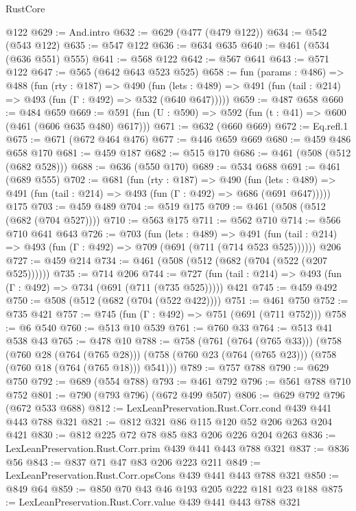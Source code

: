 \begin{lexlean}{RustCore}
\begin{coremodule}
    @122
@629 := And.intro
@632 := @629 (@477 (@479 @122))
@634 := @542 (@543 @122)
@635 := @547 @122
@636 := @634 @635
@640 := @461 (@534 (@636 @551) @555)
@641 := @568 @122
@642 := @567 @641
@643 := @571 @122
@647 := @565 (@642 @643 @523 @525)
@658 := fun (params : @486) =>
  @488
    (fun (rty : @187) =>
    @490
      (fun (lets : @489) => @491 (fun (tail : @214) => @493 (fun (Γ : @492) => @532 (@640 @647)))))
@659 := @487 @658
@660 := @484 @659
@669 := @591 (fun (U : @590) => @592 (fun (t : @41) => @600 (@461 (@606 @635 @480) @617)))
@671 := @632 (@660 @669)
@672 := Eq.refl.{1}
@675 := @671 (@672 @464 @476)
@677 := @446 @659 @669
@680 := @459 @486 @658 @170
@681 := @459 @187
@682 := @515 @170
@686 := @461 (@508 (@512 (@682 @528)))
@688 := @636 (@550 @170)
@689 := @534 @688
@691 := @461 (@689 @555)
@702 := @681
    (fun (rty : @187) =>
    @490
      (fun (lets : @489) => @491 (fun (tail : @214) => @493 (fun (Γ : @492) => @686 (@691 @647)))))
    @175
@703 := @459 @489
@704 := @519 @175
@709 := @461 (@508 (@512 (@682 (@704 @527))))
@710 := @563 @175
@711 := @562 @710
@714 := @566 @710 @641 @643
@726 := @703
    (fun (lets : @489) =>
    @491 (fun (tail : @214) => @493 (fun (Γ : @492) => @709 (@691 (@711 (@714 @523 @525))))))
    @206
@727 := @459 @214
@734 := @461 (@508 (@512 (@682 (@704 (@522 (@207 @525))))))
@735 := @714 @206
@744 := @727 (fun (tail : @214) => @493 (fun (Γ : @492) => @734 (@691 (@711 (@735 @525))))) @421
@745 := @459 @492
@750 := @508 (@512 (@682 (@704 (@522 @422))))
@751 := @461 @750
@752 := @735 @421
@757 := @745 (fun (Γ : @492) => @751 (@691 (@711 @752)))
@758 := @6 @540
@760 := @513 @10 @539
@761 := @760 @33
@764 := @513 @41 @538 @43
@765 := @478 @10
@788 := @758
    (@761 (@764 (@765 @33)))
    (@758
      (@760 @28 (@764 (@765 @28)))
      (@758 (@760 @23 (@764 (@765 @23))) (@758 (@760 @18 (@764 (@765 @18))) @541)))
@789 := @757 @788
@790 := @629 @750
@792 := @689 (@554 @788)
@793 := @461 @792
@796 := @561 @788 @710 @752
@801 := @790 (@793 @796) (@672 @499 @507)
@806 := @629 @792 @796 (@672 @533 @688)
@812 := LexLeanPreservation.Rust.Corr.cond @439 @441 @443 @788 @321
@821 := @812 @321 @86 @115 @120 @52 @206 @263 @204 @421
@830 := @812 @225 @72 @78 @85 @83 @206 @226 @204 @263
@836 := LexLeanPreservation.Rust.Corr.prim @439 @441 @443 @788 @321
@837 := @836 @56
@843 := @837 @71 @47 @83 @206 @223 @211
@849 := LexLeanPreservation.Rust.Corr.opsCons @439 @441 @443 @788 @321
@850 := @849 @64
@859 := @850 @70 @43 @46 @193 @205 @222 @181 @23 @188
@875 := LexLeanPreservation.Rust.Corr.value
    @439
    @441
    @443
    @788
    @321

\end{coremodule}
\end{lexlean}

